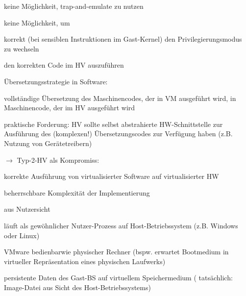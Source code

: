 \documentclass[a4paper]{article}
\begin{document}
\begin{multicols}{3}
    \begin{itemize*}
        \item
        keine Möglichkeit, trap-and-emulate zu nutzen
        \item
        keine Möglichkeit, um
        \begin{enumerate*}

            \item korrekt (bei sensiblen Instruktionen im Gast-Kernel) den Privilegierungsmodus zu wechseln
            \item den korrekten Code im HV auszuführen
        \end{enumerate*}
    \end{itemize*}

    Übersetzungsstrategie in Software:

    \begin{itemize*}
        \item
        vollständige Übersetzung des Maschinencodes, der in VM ausgeführt
        wird, in Maschinencode, der im HV ausgeführt wird
        \item
        praktische Forderung: HV sollte selbst abstrahierte HW-Schnittstelle
        zur Ausführung des (komplexen!) Übersetzungscodes zur Verfügung haben
        (z.B. Nutzung von Gerätetreibern)
        \item
        $\rightarrow$  Typ-2-HV als Kompromiss:
        \begin{itemize*}
            \item korrekte Ausführung von virtualisierter Software auf virtualisierter HW
            \item beherrschbare Komplexität der Implementierung
        \end{itemize*}
    \end{itemize*}

    aus Nutzersicht

    \begin{itemize*}
        \item
        läuft als gewöhnlicher Nutzer-Prozess auf Host-Betriebssystem (z.B.
        Windows oder Linux)
        \item
        VMware bedienbarwie physischer Rechner (bspw. erwartet Bootmedium in
        virtueller Repräsentation eines physischen Laufwerks)
        \item
        persistente Daten des Gast-BS auf virtuellem Speichermedium (
        tatsächlich: Image-Datei aus Sicht des Host-Betriebssystems)
    \end{itemize*}


\end{multicols}
\end{document}
